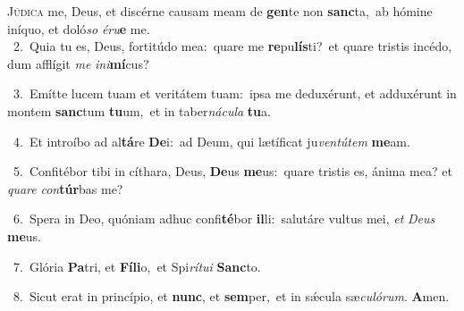 \lettrine{\initial\textcolor{\initialcolor}{J}}{údica} me, Deus, et discérne causam meam de \textbf{gen}\-te non \textbf{sanc}\-ta,~\star ab hómine iníquo, et doló\textit{so} \textit{é}\-\textit{ru}\textbf{e} me.\\
{\numbfont\textcolor{\numbcolor}{~2.}}~Quia tu es, Deus, fortitúdo mea:~\dagger quare me \textbf{re}\-pu\-\textbf{lís}\-ti?~\star et quare tristis incédo, dum afflígit \textit{me} \textit{in}\-\textit{i}\textbf{mí}cus?\par
{\numbfont\textcolor{\numbcolor}{~3.}}~Emítte lucem tuam et veritátem tuam:~\dagger ipsa me deduxérunt, et adduxérunt in montem \textbf{sanc}\-tum \textbf{tu}\-um,~\star et in taber\-\textit{ná}\-\textit{cu}\textit{la} \textbf{tu}\-a.\par
{\numbfont\textcolor{\numbcolor}{~4.}}~Et introíbo ad al\-\textbf{tá}\-re \textbf{De}\-i:~\star ad Deum, qui lætíficat ju\-\textit{ven}\-\textit{tú}\textit{tem} \textbf{me}\-am.\par
{\numbfont\textcolor{\numbcolor}{~5.}}~Confitébor tibi in cíthara, Deus, \textbf{De}\-us \textbf{me}\-us:~\star quare tristis es, ánima mea? et \textit{qua}\-\textit{re} \textit{con}\-\textbf{túr}bas me?\par
{\numbfont\textcolor{\numbcolor}{~6.}}~Spera in Deo, quóniam adhuc confi\-\textbf{té}\-bor \textbf{il}\-li:~\star salutáre vultus mei, \textit{et} \textit{De}\-\textit{us} \textbf{me}\-us.\par
{\numbfont\textcolor{\numbcolor}{~7.}}~Glória \textbf{Pa}\-tri, et \textbf{Fí}\-\textbf{li}o,~\star et Spi\-\textit{rí}\-\textit{tu}\textit{i} \textbf{Sanc}\-to.\par
{\numbfont\textcolor{\numbcolor}{~8.}}~Sicut erat in princípio, et \textbf{nunc}\-, et \textbf{sem}\-per,~\star et in sǽcula sæ\-\textit{cu}\-\textit{ló}\textit{rum}. \textbf{A}\-men.\par
